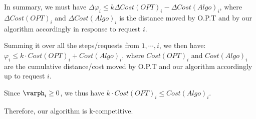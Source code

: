 \documentclass[11pt]{article}
\begin{document}
In summary, we must have $\Delta{\varphi}_i \leq k \Delta{Cost(OPT)}_i - \Delta{Cost(Algo)}_i$, where $\Delta{Cost(OPT)}_i$ and $\Delta{Cost(Algo)}_i$ is the distance moved by O.P.T and by our algorithm accordingly in response to request $i$. \newline 

Summing it over all the steps/requests from $1, \cdots, i$, we then have: \newline
$\varphi_i \leq k \cdot Cost(OPT)_i + Cost(Algo)_i$, where $Cost(OPT)_i$ and $Cost(Algo)_i$ are the cumulative distance/cost moved by O.P.T and our algorithm accordingly up to request $i$. \newline 

Since $\varph_i \geq 0$, we thus have $ k \cdot Cost(OPT)_i \leq Cost(Algo)_i$. \newline

Therefore, our algorithm is k-competitive. 
\end{document}
